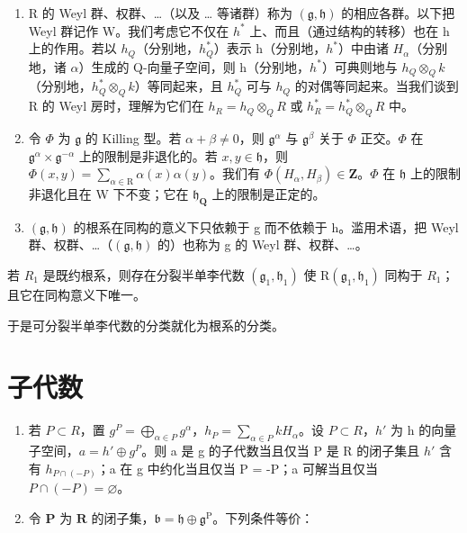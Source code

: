 \begin{enumerate}
\def\labelenumi{\arabic{enumi})}
\setcounter{enumi}{9}
\item
  R 的 Weyl 群、权群、\ldots{}（以及 \ldots{} 等诸群）称为 \((\mathfrak{g},\mathfrak{h})\) 的相应各群。以下把 Weyl 群记作 W。我们考虑它不仅在 \(h^{*}\) 上、而且（通过结构的转移）也在 h 上的作用。若以 \(h_{Q}\)（分别地，\(h_{Q}^{*}\)）表示 h（分别地，\(h^{*}\)）中由诸 \(H_{\alpha}\)（分别地，诸 \(\alpha\)）生成的 Q-向量子空间，则 h（分别地，\(h^{*}\)）可典则地与 \(h_{Q} \otimes_{Q} k\)（分别地，\(h_{Q}^{*} \otimes_{Q} k\)）等同起来，且 \(h_{Q}^{*}\) 可与 \(h_{Q}\) 的对偶等同起来。当我们谈到 R 的 Weyl 房时，理解为它们在 \(h_{R} = h_{Q} \otimes_{Q} R\) 或 \(h_{R}^{*} = h_{Q}^{*} \otimes_{Q} R\) 中。
\item
  令 \(\varPhi\) 为 \(\mathfrak{g}\) 的 Killing 型。若 \(\alpha + \beta \neq 0\)，则 \(\mathfrak{g}^{\alpha}\) 与 \(\mathfrak{g}^{\beta}\) 关于 \(\varPhi\) 正交。\(\varPhi\) 在 \(\mathfrak{g}^{\alpha} \times \mathfrak{g}^{-\alpha}\) 上的限制是非退化的。若 \(x, y \in \mathfrak{h}\)，则 \(\varPhi(x, y) = \sum_{\alpha \in \mathrm{R}} \alpha(x)\alpha(y)\)。我们有 \(\varPhi(H_{\alpha}, H_{\beta}) \in \mathbf{Z}\)。\(\varPhi\) 在 \(\mathfrak{h}\) 上的限制非退化且在 W 下不变；它在 \(\mathfrak{h}_{\mathbf{Q}}\) 上的限制是正定的。
\item
  \((\mathfrak{g},\mathfrak{h})\) 的根系在同构的意义下只依赖于 g 而不依赖于 h。滥用术语，把 Weyl 群、权群、\ldots{}（\((\mathfrak{g},\mathfrak{h})\) 的）也称为 g 的 Weyl 群、权群、\ldots{}。
\end{enumerate}

若 \(R_{1}\) 是既约根系，则存在分裂半单李代数 \((\mathfrak{g}_{1},\mathfrak{h}_{1})\) 使 \(\mathrm{R}(\mathfrak{g}_{1},\mathfrak{h}_{1})\) 同构于 \(R_{1}\)；且它在同构意义下唯一。

于是可分裂半单李代数的分类就化为根系的分类。

\section*{子代数}

\begin{enumerate}
\def\labelenumi{\arabic{enumi})}
\setcounter{enumi}{12}
\item
  若 \(P \subset R\)，置 \(g^{P} = \bigoplus_{\alpha \in P} g^{\alpha}\)，\(h_{P} = \sum_{\alpha \in P} kH_{\alpha}\)。设 \(P \subset R\)，\(h'\) 为 h 的向量子空间，\(a = h' \oplus g^{P}\)。则 a 是 g 的子代数当且仅当 P 是 R 的闭子集且 \(h'\) 含有 \(h_{P \cap (-P)}\)；a 在 g 中约化当且仅当 P = -P；a 可解当且仅当 \(P \cap (-P) = \varnothing\)。
\item
  令 \(\mathbf{P}\) 为 \(\mathbf{R}\) 的闭子集，\(\mathfrak{b} = \mathfrak{h} \oplus \mathfrak{g}^{\mathrm{P}}\)。下列条件等价：
\end{enumerate}

